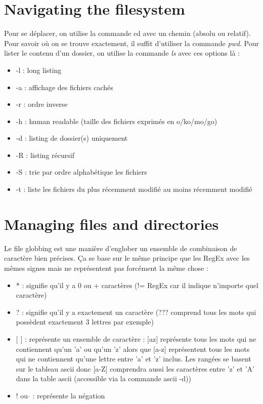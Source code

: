 \documentclass{article}
\begin{document}
\section{Navigating the filesystem}
Pour se déplacer, on utilise la commande cd avec un chemin (absolu ou relatif). Pour savoir où on se trouve exactement, il suffit d'utiliser la commande \textit{pwd}.\newline
Pour lister le contenu d'un dossier, on utilise la commande \textit{ls} avec ces options là :
\begin{itemize}
    \item -l : long listing
    \item -a : affichage des fichiers cachés
    \item -r : ordre inverse
    \item -h : human readable (taille des fichiers exprimés en o/ko/mo/go) 
    \item -d : listing de dossier(s) uniquement
    \item -R : listing récursif
    \item -S : trie par ordre alphabétique les fichiers
    \item -t : liste les fichiers du plus récemment modifié au moins récemment modifié
\end{itemize}


\newpage
\section{Managing files and directories}
Le file globbing est une manière d'englober un ensemble de combinaison de caractère bien précises. Ça se base sur le même principe que les RegEx avec les mêmes signes mais ne représentent pas forcément la même chose :
\begin{itemize}
    \item * : signifie qu'il y a 0 ou + caractères (!= RegEx car il indique n'importe quel caractère)
    \item ? : signifie qu'il y a exactement un caractère (??? comprend tous les mots qui possèdent exactement 3 lettres par exemple)
    \item $[$ $]$ : représente un ensemble de caractère : $[$az$]$ représente tous les mots qui ne contiennent qu'un 'a' ou qu'un 'z' alors que $[$a-z$]$ représentent tous les mots qui ne contiennent qu'une lettre entre 'a' et 'z' inclus. Les rangées se basent sur le tableau ascii donc [a-Z] comprendra aussi les caractères entre 'z' et 'A' dans la table ascii (accessible via la commande ascii -d))
    \item ! ou $\hat{}$ : représente la négation
\end{itemize}
\end{document}
